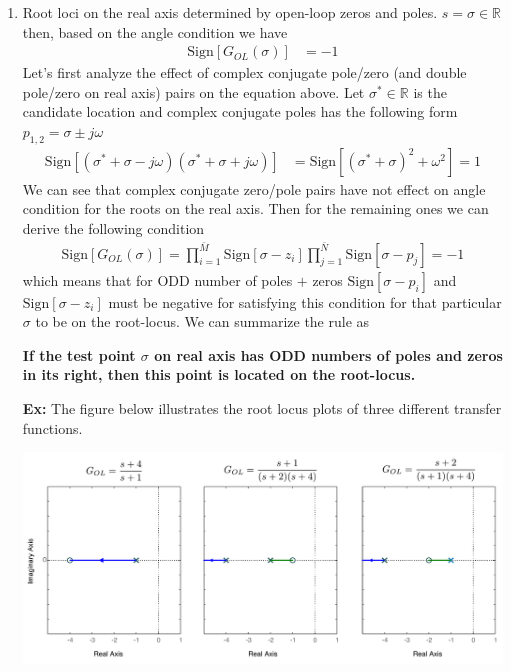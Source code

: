 \documentclass[twoside]{article}
\begin{document}
\begin{enumerate}
\item Root loci on the real axis determined by open-loop zeros and
  poles. $s = \sigma \in \mathbb{R}$ then, based on the angle condition
  we have
%
\begin{align*}
\mathrm{Sign} [ G_{OL}(\sigma) ] &= -1
\end{align*}
%
Let's first analyze the effect of complex conjugate pole/zero (and double pole/zero on real axis)
pairs on the equation above. Let $\sigma^* \in \mathbb{R}$  is the candidate location and complex
conjugate poles has the following form $p_{1,2} = \sigma \pm j \omega$
\begin{align*}
\mathrm{Sign} [ ( \sigma^* + \sigma - j \omega) (\sigma^* + \sigma + j \omega) ] &= \mathrm{Sign} [ (\sigma^* + \sigma)^2 + \omega^2 ] 
= 1 
\end{align*}
%
We can see that complex conjugate zero/pole pairs have not effect 
on angle condition for the roots on the real axis. Then for
the remaining ones we can derive the following condition
%
\begin{align*}
\mathrm{Sign} [ G_{OL}(\sigma) ] = \prod_{i=1}^{\bar{M}}  \mathrm{Sign} [\sigma - z_i]
  \prod_{j=1}^{\bar{N}}  \mathrm{Sign} [\sigma - p_j] = -1
\end{align*}
%
which means that for ODD number of poles $+$  zeros 
$\mathrm{Sign} [\sigma - p_i ]$ and $\mathrm{Sign} [\sigma - z_i] $ 
must be negative for satisfying this condition for that particular $\sigma$
to be on the root-locus. We can summarize the rule as

\textbf{If the test point $\sigma$ on real axis has ODD numbers of 
poles and zeros in its right, then this point is located 
on the root-locus.}

\newpage

\textbf{Ex:} The figure below illustrates the root locus plots
of three different transfer functions.

\begin{center}
\begin{minipage}[h]{0.99\linewidth}
    \begin{center}
      \includegraphics[width=\textwidth]{realaxis}
    \end{center}
\end{minipage}
\end{center}


\end{enumerate}
\end{document}
